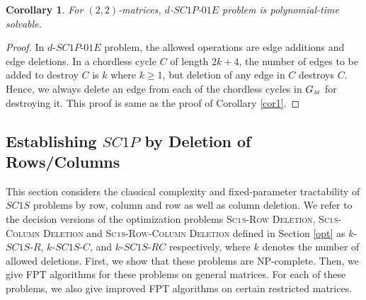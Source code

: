 \documentclass[review, 1p]{elsarticle}
\newtheorem{corollary}{Corollary}
\begin{document}
\begin{corollary}
For $(2,2)$-matrices, $d$-$SC1P$-$01E$ problem is polynomial-time solvable.
\end{corollary}
\begin{proof}
 In $d$-$SC1P$-$01E$ problem, the allowed operations are edge additions and edge deletions. In a chordless cycle $C$ of length $2k+4$, the number of edges to be added to destroy $C$ is $k$ where $k \geq 1$, but deletion of any edge in $C$ destroys $C$. Hence, we always delete an edge from each of the chordless cycles in $G_{\mathsmaller{M}}$ for destroying it. This proof is same as the proof of Corollary \ref{cor1}. 
\end{proof}
\subsection{\textup{\textbf{Establishing $SC1P$ by Deletion of Rows/Columns}}} \label{estrc}
This section considers the classical complexity and fixed-parameter tractability of $SC1S$ problems by row, column and row as well as column deletion. We refer to the decision versions of the optimization problems \textsc{Sc$\mathsmaller1$s-Row Deletion}, \textsc{Sc$\mathsmaller 1$s-Column Deletion} and \textsc{Sc$\mathsmaller 1$s-Row-Column Deletion} defined in Section \ref{opt} as $k$-$SC1S$-$R$, $k$-$SC1S$-$C$, and $k$-$SC1S$-$RC$ respectively, where $k$ denotes the number of allowed deletions. First, we show that these problems are NP-complete. Then, we give FPT algorithms for these problems on general matrices. For each of these  problems, we also give improved FPT algorithms on certain restricted matrices.
\end{document}

